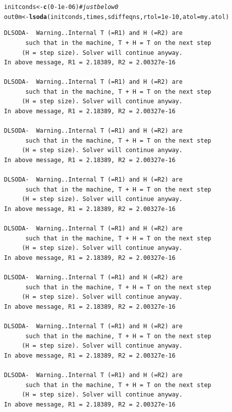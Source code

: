 \documentclass[a4paper]{article}\usepackage[]{graphicx}\usepackage[]{color}
\makeatletter
\newcommand{\hlnum}[1]{\textcolor[rgb]{0.686,0.059,0.569}{#1}}%
\newcommand{\hlcom}[1]{\textcolor[rgb]{0.678,0.584,0.686}{\textit{#1}}}%
\newcommand{\hlopt}[1]{\textcolor[rgb]{0,0,0}{#1}}%
\newcommand{\hlstd}[1]{\textcolor[rgb]{0.345,0.345,0.345}{#1}}%
\newcommand{\hlkwb}[1]{\textcolor[rgb]{0.69,0.353,0.396}{#1}}%
\newcommand{\hlkwc}[1]{\textcolor[rgb]{0.333,0.667,0.333}{#1}}%
\newcommand{\hlkwd}[1]{\textcolor[rgb]{0.737,0.353,0.396}{\textbf{#1}}}%
\newenvironment{kframe}{%
 \def\at@end@of@kframe{}%
 \ifinner\ifhmode%
  \def\at@end@of@kframe{\end{minipage}}%
  \begin{minipage}{\columnwidth}%
 \fi\fi%
 \def\FrameCommand##1{\hskip\@totalleftmargin \hskip-\fboxsep
 \colorbox{shadecolor}{##1}\hskip-\fboxsep
     \hskip-\linewidth \hskip-\@totalleftmargin \hskip\columnwidth}%
 \MakeFramed {\advance\hsize-\width
   \@totalleftmargin\z@ \linewidth\hsize
   \@setminipage}}%
 {\par\unskip\endMakeFramed%
 \at@end@of@kframe}
\newenvironment{knitrout}{}{} %
\makeatother
\begin{document}
\begin{knitrout}
\color{fgcolor}\begin{kframe}
\begin{alltt}
\hlstd{initconds} \hlkwb{<-} \hlkwd{c}\hlstd{(}\hlnum{0} \hlopt{-} \hlnum{1e-06}\hlstd{)}  \hlcom{# just below 0}
\hlstd{out0m} \hlkwb{<-} \hlkwd{lsoda}\hlstd{(initconds, times, sdiffeqns,} \hlkwc{rtol} \hlstd{=} \hlnum{1e-10}\hlstd{,} \hlkwc{atol} \hlstd{= my.atol)}
\end{alltt}
\begin{verbatim}
DLSODA-  Warning..Internal T (=R1) and H (=R2) are
      such that in the machine, T + H = T on the next step  
     (H = step size). Solver will continue anyway.
In above message, R1 = 2.18389, R2 = 2.00327e-16
 
DLSODA-  Warning..Internal T (=R1) and H (=R2) are
      such that in the machine, T + H = T on the next step  
     (H = step size). Solver will continue anyway.
In above message, R1 = 2.18389, R2 = 2.00327e-16
 
DLSODA-  Warning..Internal T (=R1) and H (=R2) are
      such that in the machine, T + H = T on the next step  
     (H = step size). Solver will continue anyway.
In above message, R1 = 2.18389, R2 = 2.00327e-16
 
DLSODA-  Warning..Internal T (=R1) and H (=R2) are
      such that in the machine, T + H = T on the next step  
     (H = step size). Solver will continue anyway.
In above message, R1 = 2.18389, R2 = 2.00327e-16
 
DLSODA-  Warning..Internal T (=R1) and H (=R2) are
      such that in the machine, T + H = T on the next step  
     (H = step size). Solver will continue anyway.
In above message, R1 = 2.18389, R2 = 2.00327e-16
 
DLSODA-  Warning..Internal T (=R1) and H (=R2) are
      such that in the machine, T + H = T on the next step  
     (H = step size). Solver will continue anyway.
In above message, R1 = 2.18389, R2 = 2.00327e-16
 
DLSODA-  Warning..Internal T (=R1) and H (=R2) are
      such that in the machine, T + H = T on the next step  
     (H = step size). Solver will continue anyway.
In above message, R1 = 2.18389, R2 = 2.00327e-16
 
DLSODA-  Warning..Internal T (=R1) and H (=R2) are
      such that in the machine, T + H = T on the next step  
     (H = step size). Solver will continue anyway.
In above message, R1 = 2.18389, R2 = 2.00327e-16
 

\end{verbatim}
\end{kframe}
\end{knitrout}
\end{document}
